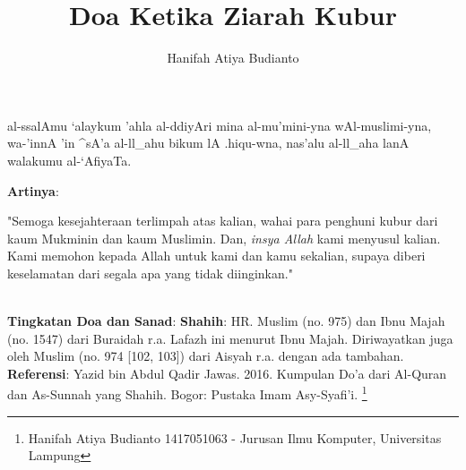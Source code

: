 \documentclass[a4paper,12pt]{article}
\title{\Large Doa Ketika Ziarah Kubur}
\author{\calligra Hanifah Atiya Budianto}
\begin{document}
\sffamily
\maketitle 
\fullvocalize
{}
\begin{arabtext}
\noindent
al-ssalAmu `alaykum 'ahla al-ddiyAri mina al-mu'mini-yna wAl-muslimi-yna, 
wa-'innA 'in ^sA'a al-ll_ahu bikum lA .hiqu-wna, nas'alu al-ll_aha lanA 
walakumu al-`AfiyaTa.\\
\end{arabtext}
\noindent
\textbf{Artinya}:
\par
\indent
"Semoga kesejahteraan terlimpah atas kalian, wahai para penghuni kubur dari
kaum Mukminin dan kaum Muslimin. Dan, \textit{insya Allah} kami menyusul 
kalian. Kami memohon kepada Allah untuk kami dan kamu sekalian, supaya 
diberi keselamatan dari segala apa yang tidak diinginkan."\\\\
\par
\noindent
\textbf{Tingkatan Doa dan Sanad}: \textbf{Shahih}: HR. Muslim (no.  975) 
dan Ibnu Majah (no. 1547) dari Buraidah r.a. Lafazh ini menurut Ibnu Majah.
Diriwayatkan juga oleh Muslim (no. 974 [102, 103]) dari Aisyah r.a. dengan 
ada tambahan.\\
\textbf{Referensi}: Yazid bin Abdul Qadir Jawas. 2016. Kumpulan Do'a dari
Al-Quran dan As-Sunnah yang Shahih. Bogor: Pustaka Imam Asy-Syafi'i.
\footnote{Hanifah Atiya Budianto 1417051063 - Jurusan Ilmu Komputer,
Universitas Lampung}
\end{document}

